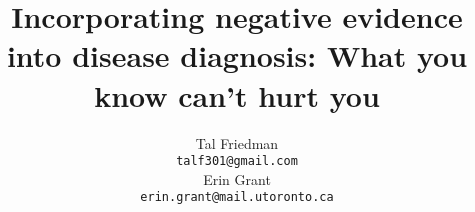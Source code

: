 \documentclass{article} %
\title{
 Incorporating negative evidence into disease diagnosis:
 What you know can't hurt you
}
\author{
Tal Friedman 
\\
\texttt{talf301@gmail.com} \\
\And
Erin Grant 
\\
\texttt{erin.grant@mail.utoronto.ca}
}
\begin{document}
\nobibliography*

\maketitle












\end{document}
